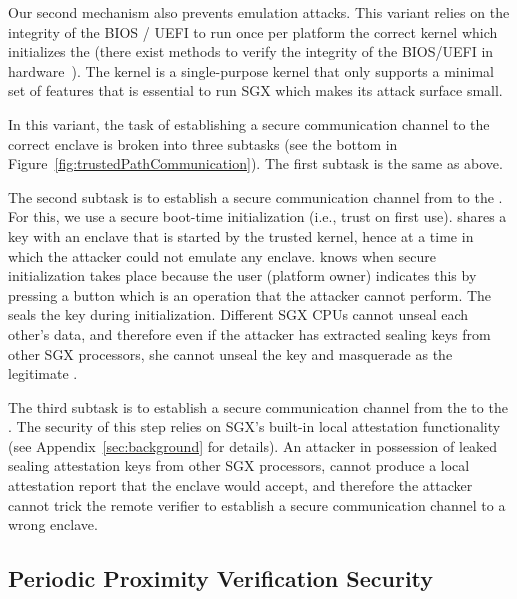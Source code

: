 \ifusenix
\vspace{-14pt}
\else
\fi
{} Our second mechanism also prevents emulation attacks. This variant relies on the integrity of the BIOS / UEFI to run once per platform the correct \name kernel which initializes the \nameclave (there exist methods to verify the integrity of the BIOS/UEFI in hardware~\cite{titanchip}). 
The \name kernel is a single-purpose kernel that only supports a minimal set of features that is essential to run SGX which makes its attack surface small. 

In this variant, the task of establishing a secure communication channel to the correct enclave is broken into three subtasks (see the bottom in Figure~\ref{fig:trustedPathCommunication}). The first subtask is the same as above.

The second subtask is to establish a secure communication channel from \device to the \nameclave. For this, we use a secure boot-time initialization (i.e., trust on first use). \device shares a key with an enclave that is started by the trusted \name kernel, hence at a time in which the attacker could not emulate any enclave. \device knows when secure initialization takes place because the user (platform owner) indicates this by pressing a button which is an operation that the attacker cannot perform. The \nameclave seals the key during initialization. Different SGX CPUs cannot unseal each other's data, and therefore even if the attacker has extracted sealing keys from other SGX processors, she cannot unseal the key and masquerade as the legitimate \nameclave. %

The third subtask is to establish a secure communication channel from the \nameclave to the \app. The security of this step relies on SGX's built-in local attestation functionality (see Appendix~\ref{sec:background} for details). An attacker in possession of leaked sealing attestation keys from other SGX processors, cannot produce a local attestation report that the \name enclave would accept, and therefore the attacker cannot trick the remote verifier to establish a secure communication channel to a wrong enclave.

\subsection{Periodic Proximity Verification Security}

